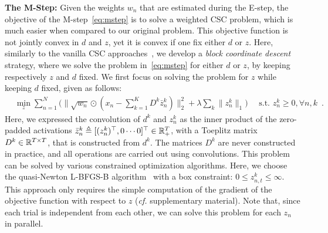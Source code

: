 


\textbf{The M-Step:} 
Given the weights $w_n$ that are estimated during the E-step, the objective of the M-step~\eqref{eq:mstep} is to solve a weighted CSC problem, which is much easier when compared to our original problem. 
%
This objective function is not jointly convex in $d$ and $z$, yet it is convex if one fix
either $d$ or $z$.
Here, similarly to the vanilla CSC approaches~\citep{gips2017discovering,Grosse-etal:2007}, we develop a \emph{block coordinate descent} strategy, where we solve the problem in~\eqref{eq:mstep} for either $d$ or $z$, by keeping respectively $z$ and $d$ fixed.
%
%
%
We first focus on solving the problem for $z$ while keeping $d$ fixed, given as follows:
\begin{align}
& \min_{z} \sum_{n=1}^{N} \Big( \|\sqrt{w_{n}} \odot (x_{n} - \sum_{k=1}^{K}D^{k} \bar{z}_{n}^{k})\|_{2}^{2} + \lambda \sum_{k}{ \|{z}_{n}^{k} \|_1}\Big) \quad \text{ s.t.  } {z}_n^k \geq 0, \forall n,k\enspace .
\label{eq:problem_definition_z}
\end{align} 
Here, we expressed the convolution of $d^k$ and $z_n^k$ as the inner product of the zero-padded activations $\bar{z}_n^k \triangleq [(z_n^k)^\top, 0 \cdots 0]^\top \in \mathbb{R}^{T}_+$, with a Toeplitz matrix $D^k \in \mathbb{R}^{T \times T}$, that is constructed from $d^k$.
The matrices $D^k$ are never constructed in practice, and all operations are carried out using convolutions.
This problem can be solved by various constrained optimization algorithms. Here, we choose the quasi-Newton L-BFGS-B algorithm~\cite{byrd1995limited} with a box constraint: $0 \leq z_{n,t}^k \leq \infty$. This approach only requires the simple computation of the gradient of the objective function with respect to $z$ (\textit{cf.} supplementary material). Note that, since each trial is independent from each other, we can solve this problem for each $z_n$ in parallel. 

